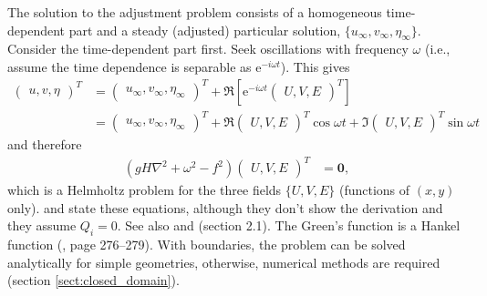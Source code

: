 \documentclass[10pt,reqno]{amsart}
\newcommand{\expe}{{\mathrm e}}
\newcommand{\bfz}{{\mathbf 0}}
\begin{document}
The solution to the adjustment problem consists of a homogeneous time-dependent part and a steady (adjusted) particular solution, $\{ u_{\infty}, v_{\infty}, \eta_{\infty} \}$.
Consider the time-dependent part first. 
Seek oscillations with frequency $\omega$ (i.e., assume the time dependence is separable as $\expe^{- i \omega t}$).
This gives
\begin{align}
\begin{pmatrix}
u , 
v ,
\eta
\end{pmatrix}^T & = \begin{pmatrix} u_{\infty}, 
v_{\infty}, 
\eta_{\infty} 
\end{pmatrix}^T + \Re \left[ \expe^{-i \omega t}  \begin{pmatrix}
U , 
V ,
E
\end{pmatrix}^T \right]
\label{eqn:gen_solution1}  \\
& = \begin{pmatrix} u_{\infty}, 
v_{\infty}, 
\eta_{\infty} 
\end{pmatrix}^T + \Re \begin{pmatrix}
U , 
V ,
E
\end{pmatrix}^T \cos \omega t +
\Im \begin{pmatrix}
U , 
V ,
E
\end{pmatrix}^T \sin \omega t 
\end{align}
and therefore
\begin{align}
\left( g H \nabla^2 +  \omega^2 - f^2  \right)
\begin{pmatrix}
U , 
V ,
E
\end{pmatrix}^T & = 
\bfz ,   
\end{align}
which is a Helmholtz problem for the three fields $\{ U, V, E \}$ (functions of $(x,y)$ only).
\citet{thomson1880} and \citet{taylor1922} state these equations, although they don't show the derivation and they assume $Q_i = 0$.
See also \citet{gill76} and \citet{pratt&whitehead08} (section 2.1).
The Green's function is a Hankel function (\citealt{duffy01}, page 276--279).
With boundaries, the problem can be solved analytically for simple geometries, otherwise, numerical methods are required (section \ref{sect:closed_domain}).
\end{document}
